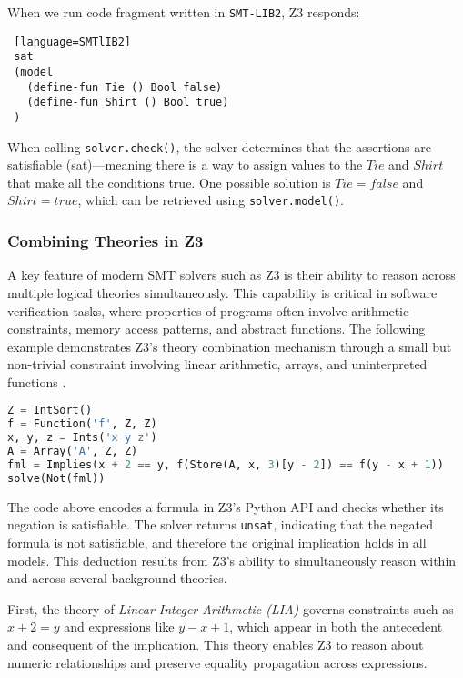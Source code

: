 \documentclass[]{rptuseminar}
\begin{document}
\vspace{1em}

When we run code fragment written in \texttt{SMT-LIB2}, Z3 responds:
\begin{lstlisting} [language=SMTlIB2]
 sat
 (model
   (define-fun Tie () Bool false)
   (define-fun Shirt () Bool true)
 )
\end{lstlisting}
\vspace{1em}


When calling \texttt{solver.check()}, the solver determines that the assertions are satisfiable
(sat)—meaning there is a way to assign values to the \(Tie\) and \(Shirt\) that make all the 
conditions true. One possible solution is \(Tie = false\) and \(Shirt = true\), which can be retrieved using \texttt{solver.model()}.
\vspace{1em}


\subsubsection{Combining Theories in Z3}

A key feature of modern SMT solvers such as Z3 is their ability to reason across multiple logical theories simultaneously. 
This capability is critical in software verification tasks, where properties of programs often involve 
arithmetic constraints, memory access patterns, and abstract functions. 
The following example demonstrates Z3’s theory combination mechanism through a small but non-trivial 
constraint involving linear arithmetic, arrays, and uninterpreted functions \cite{nikolaj_bjorner_programming_nodate}.

\begin{lstlisting}[language=Python, label={lst:combined-theories}]
Z = IntSort()
f = Function('f', Z, Z)
x, y, z = Ints('x y z')
A = Array('A', Z, Z)
fml = Implies(x + 2 == y, f(Store(A, x, 3)[y - 2]) == f(y - x + 1))
solve(Not(fml))

\end{lstlisting}
\vspace{1em}

The code above encodes a formula in Z3’s Python API and checks whether its negation is satisfiable. The solver returns \texttt{unsat}, indicating that the negated formula is not satisfiable, and therefore the original implication holds in all models. This deduction results from Z3’s ability to simultaneously reason within and across several background theories.

First, the theory of \emph{Linear Integer Arithmetic (LIA)} governs constraints such as \(x + 2 = y\) and expressions like \(y - x + 1\), which appear in both the antecedent and consequent of the implication. This theory enables Z3 to reason about numeric relationships and preserve equality propagation across expressions.
\end{document}
